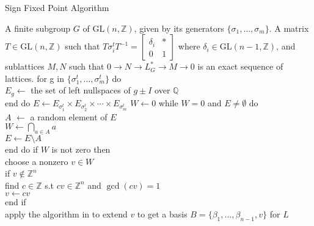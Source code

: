 \documentclass{article}
\theoremstyle{plain}
\theoremstyle{definition}
\newcommand{\Z}{\ensuremath{\mathbb{Z}}}
\newcommand{\Q}{\ensuremath{\mathbb{Q}}}
\begin{document}
\begin{algorithm}[H]
	\caption{Sign Fixed Point Algorithm}
	\label{alg:Sign Fixed Point}
	\begin{algorithmic}[1]
		\REQUIRE A finite subgroup $G$ of $\mathrm{GL}(n,\Z)$, given by its generators $\lbrace \sigma_1, \ldots , \sigma_m \rbrace$.
		\ENSURE A matrix $T \in \mathrm{GL}(n,\Z)$ such that $T \sigma^t_i T^{-1}= \left[ \begin{array}{c|c}
		\delta_i & \ast \\
		\hline 
		0 &1
		\end{array} \right]
		$ where $\delta_i \in \mathrm{GL}(n-1,\Z)$, and sublattices $M, N$ such that $0\longrightarrow N \longrightarrow L^*_G \longrightarrow M \longrightarrow 0$ is an exact sequence of lattices.
		\bigskip
		\STATE	 for g in $\lbrace	\sigma^t_1, \ldots , \sigma^t_m \rbrace$ do\\
		\hspace{0.5 in} $E_g \gets $ the set of left nullspaces of $g \pm I$ over $\Q$\\
		end do
		\STATE $E \gets E_{\sigma^t_1} \times E_{\sigma^t_2} \times \cdots \times E_{\sigma^t_m}$
		\STATE $W \gets 0$
		\STATE while $W = 0$ and $E \neq \emptyset$ do\\
		\hspace{0.5in} $A$ $\gets$ a random element of $E$ \\
	    \hspace{0.5in}$W \gets \bigcap\limits_{a\in A}a$\\
	      \hspace{0.5in}$E \gets E \setminus A$\\
	    end do
	    \STATE if $W $ is not zero then\\
	    \hspace{0.5in} choose a nonzero $v \in W$\\
	    \hspace{0.5 in} if $v \notin \Z^n$ \\
	    \hspace{1in} find $c \in \Z$ s.t $cv \in \Z^n$ and $\gcd(cv) = 1$\\
	    \hspace{1in} $v \gets cv$\\
	    \hspace{0.5 in} end if\\
	    \hspace{0.5in} apply the algorithm in \cite{LatticeBase} to extend $v$ to get a basis $B = \lbrace \beta_1, \ldots, \beta_{n-1},v\rbrace$ for $L$\\

\end{algorithmic}
\end{algorithm}
\end{document}
